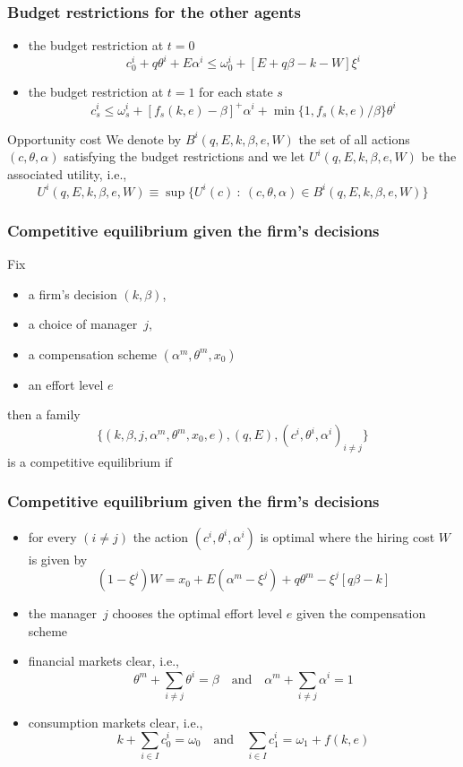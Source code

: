 \documentclass[blue]{beamer}
\def\leq{\leqslant}
\def\et{\quad \textrm{and} \quad}
\theoremstyle{definition}
\theoremstyle{example}
\begin{document}
\begin{frame}\frametitle{Budget restrictions for the other agents}

\begin{itemize}
\item the budget restriction at $t=0$
\[
c^i_0 + q \theta^i + E \alpha^i \leq \omega^i_0 + [E+q\beta - k - W] \xi^i
\]
\item the budget restriction at $t=1$ for each state $s$
\[
c^i_s \leq \omega^i_s + [f_s(k,e)-\beta]^+ \alpha^i + \min\{1,f_s(k,e)/\beta\} \theta^i
\]
\end{itemize}
\begin{block}{Opportunity cost}
We denote by $B^i(q,E,k,\beta,e,W)$ the set of all actions $(c,\theta,\alpha)$ satisfying the budget restrictions and we let $U^i(q,E,k,\beta,e,W)$ be the associated utility, i.e.,
\[
U^i(q,E,k,\beta,e,W) \equiv \sup \{ U^i(c) \ \colon \ (c,\theta,\alpha) \in B^i(q,E,k,\beta,e,W)\}
\]
\end{block}
\end{frame}


\begin{frame}\frametitle{Competitive equilibrium given the firm's decisions}

Fix
\begin{itemize}
\item a firm's decision $(k,\beta)$,
\item a choice of manager~$j$,
\item a compensation scheme $(\alpha^m,\theta^m,x_0)$
\item an effort level $e$
\end{itemize}
then a family
\[
\{(k,\beta,j,\alpha^m,\theta^m,x_0,e),(q,E),(c^i,\theta^i,\alpha^i)_{i\neq j}\}
\]
is a competitive equilibrium if

\end{frame}


\begin{frame}\frametitle{Competitive equilibrium given the firm's decisions}

\begin{itemize}
\item for every $(i\neq j)$ the action $(c^i,\theta^i,\alpha^i)$ is optimal where the hiring cost $W$ is given by
\[
(1-\xi^j) W = x_0 + E(\alpha^m-\xi^j) + q\theta^m - \xi^j[q \beta - k]
\]
\item the manager~$j$ chooses the optimal effort level $e$ given the compensation scheme
\item financial markets clear, i.e.,
\[
\theta^m + \sum_{i\neq j} \theta^i = \beta \et \alpha^m + \sum_{i\neq j} \alpha^i = 1
\]
\item consumption markets clear, i.e.,
\[
k + \sum_{i\in I} c^i_0 = \omega_0 \et \sum_{i\in I} c^i_1 = \omega_1 + f(k,e)
\]
\end{itemize}

\end{frame}
\end{document}
